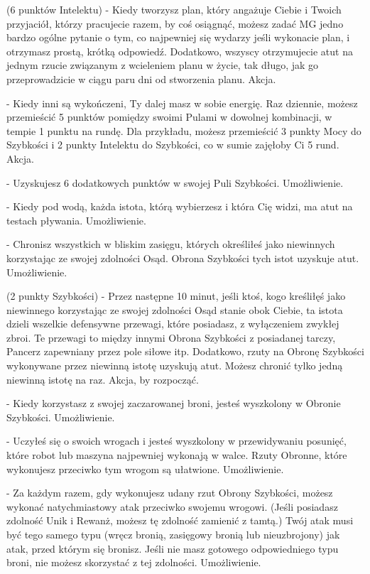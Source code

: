 { (6 punktów Intelektu) - Kiedy tworzysz plan, który angażuje Ciebie i Twoich przyjaciół, którzy pracujecie razem, by coś osiągnąć, możesz zadać MG jedno bardzo ogólne pytanie o tym, co najpewniej się wydarzy jeśli wykonacie plan, i otrzymasz prostą, krótką odpowiedź. Dodatkowo, wszyscy otrzymujecie atut na jednym rzucie związanym z wcieleniem planu w życie, tak długo, jak go przeprowadzicie w ciągu paru dni od stworzenia planu. Akcja.

 - Kiedy inni są wykończeni, Ty dalej masz w sobie energię. Raz dziennie, możesz przemieścić 5 punktów pomiędzy swoimi Pulami w dowolnej kombinacji, w tempie 1 punktu na rundę. Dla przykładu, możesz przemieścić 3 punkty Mocy do Szybkości i 2 punkty Intelektu do Szybkości, co w sumie zajęłoby Ci 5 rund. Akcja.

 - Uzyskujesz 6 dodatkowych punktów w swojej Puli Szybkości. Umożliwienie.

 - Kiedy pod wodą, każda istota, którą wybierzesz i która Cię widzi, ma atut na testach pływania. Umożliwienie.

 - Chronisz wszystkich w bliskim zasięgu, których określiłeś jako niewinnych korzystając ze swojej zdolności Osąd. Obrona Szybkości tych istot uzyskuje atut. Umożliwienie.

 (2 punkty Szybkości) - Przez następne 10 minut, jeśli ktoś, kogo kreśliłęś jako niewinnego korzystając ze swojej zdolności Osąd stanie obok Ciebie, ta istota dzieli wszelkie defensywne przewagi, które posiadasz, z wyłączeniem zwykłej zbroi. Te przewagi to między innymi Obrona Szybkości z posiadanej tarczy, Pancerz zapewniany przez pole siłowe itp. Dodatkowo, rzuty na Obronę Szybkości wykonywane przez niewinną istotę uzyskują atut. Możesz chronić tylko jedną niewinną istotę na raz. Akcja, by rozpocząć.

 - Kiedy korzystasz z swojej zaczarowanej broni, jesteś wyszkolony w Obronie Szybkości. Umożliwienie.

 - Uczyłeś się o swoich wrogach i jesteś wyszkolony w przewidywaniu posunięć, które robot lub maszyna najpewniej wykonają w walce. Rzuty Obronne, które wykonujesz przeciwko tym wrogom są ułatwione. Umożliwienie.

 - Za każdym razem, gdy wykonujesz udany rzut Obrony Szybkości, możesz wykonać natychmiastowy atak przeciwko swojemu wrogowi. (Jeśli posiadasz zdolność Unik i Rewanż, możesz tę zdolność zamienić z tamtą.) Twój atak musi być tego samego typu (wręcz bronią, zasięgowy bronią lub nieuzbrojony) jak atak, przed którym się bronisz. Jeśli nie masz gotowego odpowiedniego typu broni, nie możesz skorzystać z tej zdolności. Umożliwienie.

}

